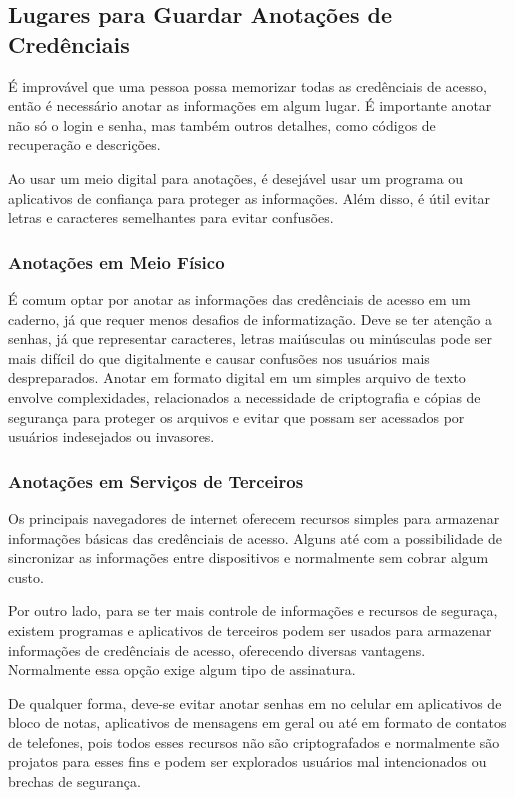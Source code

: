 \documentclass[12pt]{article}
\begin{document}
\subsection{Lugares para Guardar Anotações de Credênciais}

É improvável que uma pessoa possa memorizar todas as credênciais de acesso,
então é necessário anotar as informações em algum lugar.
É importante anotar não só o login e senha, mas também outros detalhes,
como códigos de recuperação e descrições.

Ao usar um meio digital para anotações, é desejável usar um programa ou
aplicativos de confiança para proteger as informações. Além disso, é útil
evitar letras e caracteres semelhantes para evitar confusões.

\subsubsection{Anotações em Meio Físico}

É comum optar por anotar as informações das credênciais de acesso em um
caderno, já que requer menos desafios de informatização.
Deve se ter atenção a senhas, já que representar caracteres, letras
maiúsculas ou minúsculas pode ser mais difícil do que digitalmente e
causar confusões nos usuários mais despreparados.
Anotar em formato digital em um simples arquivo de texto envolve
complexidades, relacionados a necessidade de criptografia e cópias de
segurança para proteger os arquivos e evitar que possam ser
acessados por usuários indesejados ou invasores.

\subsubsection{Anotações em Serviços de Terceiros}

Os principais navegadores de internet oferecem recursos simples para
armazenar informações básicas das credênciais de acesso. Alguns até
com a possibilidade de sincronizar as informações entre dispositivos e
normalmente sem cobrar algum custo.

Por outro lado, para se ter mais controle de informações e recursos de
seguraça, existem programas e aplicativos de terceiros podem ser usados
para armazenar informações de credênciais de acesso, oferecendo diversas
vantagens. Normalmente essa opção exige algum tipo de assinatura.

De qualquer forma, deve-se evitar anotar senhas em no celular em
aplicativos de bloco de notas, aplicativos de mensagens em geral ou até
em formato de contatos de telefones, pois todos esses recursos não são
criptografados e normalmente são projatos para esses fins e podem ser
explorados usuários mal intencionados ou brechas de segurança.
\end{document}

